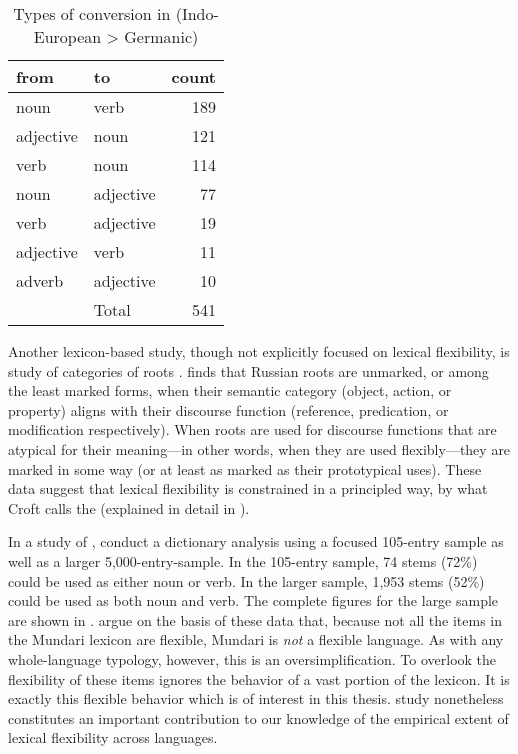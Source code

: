 \begin{table}[h]
  \centering
  \caption[Types of conversion in English (Indo-European > Germanic)]{Types of conversion in  (Indo-European > Germanic) \parencite[416]{Cannon1985}}
  \label{tab:Cannon-1985}
  \begin{tabular}{ l l r }
    \toprule
    from      & to        & count\\
    \midrule
    noun      & verb      & 189\\
    adjective & noun      & 121\\
    verb      & noun      & 114\\
    noun      & adjective & 77\\
    verb      & adjective & 19\\
    adjective & verb      & 11\\
    adverb    & adjective & 10\\
    \midrule
    { }       & Total     & 541\\
    \bottomrule
  \end{tabular}
\end{table}

Another lexicon-based study, though not explicitly focused on lexical flexibility, is  study of categories of  roots . \citeauthor{Croft1991} finds that Russian roots are unmarked, or among the least marked forms, when their semantic category (object, action, or property) aligns with their discourse function (reference, predication, or modification respectively). When roots are used for discourse functions that are atypical for their meaning—in other words, when they are used flexibly—they are marked in some way (or at least as marked as their prototypical uses). These data suggest that lexical flexibility is constrained in a principled way, by what Croft calls the  (explained in detail in ).

In a study of , \textcite{EvansOsada2005} conduct a dictionary analysis using a focused 105-entry sample as well as a larger 5,000-entry-sample. In the 105-entry sample, 74 stems (72\%) could be used as either noun or verb. In the larger sample, 1,953 stems (52\%) could be used as both noun and verb. The complete figures for the large sample are shown in . \citeauthor{EvansOsada2005} argue on the basis of these data that, because not all the items in the Mundari lexicon are flexible, Mundari is \emph{not} a flexible language. As with any whole-language typology, however, this is an oversimplification. To overlook the flexibility of these items ignores the behavior of a vast portion of the lexicon. It is exactly this flexible behavior which is of interest in this thesis.  study nonetheless constitutes an important contribution to our knowledge of the empirical extent of lexical flexibility across languages.

